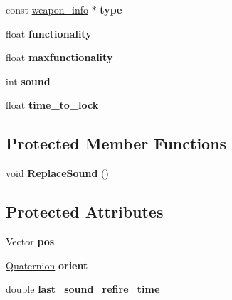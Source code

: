 \begin{DoxyCompactItemize}
\item 
const \hyperlink{structweapon__info}{weapon\+\_\+info} $\ast$ {\bfseries type}\hypertarget{classMount_a54a53819b8dfc13c188f39de0cb689c4}{}\label{classMount_a54a53819b8dfc13c188f39de0cb689c4}

\item 
float {\bfseries functionality}\hypertarget{classMount_aba480ec3705c4ea23a1193963c15936a}{}\label{classMount_aba480ec3705c4ea23a1193963c15936a}

\item 
float {\bfseries maxfunctionality}\hypertarget{classMount_aa47668f56fc40bd28c0c11cf2a2bfa5f}{}\label{classMount_aa47668f56fc40bd28c0c11cf2a2bfa5f}

\item 
int {\bfseries sound}\hypertarget{classMount_a5d391f5f507dcbaf3379befc19e7db5d}{}\label{classMount_a5d391f5f507dcbaf3379befc19e7db5d}

\item 
float {\bfseries time\+\_\+to\+\_\+lock}\hypertarget{classMount_a92a27c1d8a8fecdb6530fd63f48151a9}{}\label{classMount_a92a27c1d8a8fecdb6530fd63f48151a9}

\end{DoxyCompactItemize}
\subsection*{Protected Member Functions}
\begin{DoxyCompactItemize}
\item 
void {\bfseries Replace\+Sound} ()\hypertarget{classMount_af24d6860b43b280b47a129c020edd364}{}\label{classMount_af24d6860b43b280b47a129c020edd364}

\end{DoxyCompactItemize}
\subsection*{Protected Attributes}
\begin{DoxyCompactItemize}
\item 
Vector {\bfseries pos}\hypertarget{classMount_a956fffd39ba9a1cc34d4eeb6a628c0a2}{}\label{classMount_a956fffd39ba9a1cc34d4eeb6a628c0a2}

\item 
\hyperlink{structQuaternion}{Quaternion} {\bfseries orient}\hypertarget{classMount_a40d2d5f0c9094284b5134cf0cc3605d8}{}\label{classMount_a40d2d5f0c9094284b5134cf0cc3605d8}

\item 
double {\bfseries last\+\_\+sound\+\_\+refire\+\_\+time}\hypertarget{classMount_a92c86d80973da1da8099f148f5a68fcc}{}\label{classMount_a92c86d80973da1da8099f148f5a68fcc}

\end{DoxyCompactItemize}


